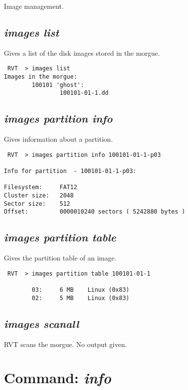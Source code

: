 \documentclass[a4paper,11pt,oneside]{report}
\begin{document}
Image management.



\subsection*{\emph{images list}}

Gives a list of the disk images stored in the morgue.

\begin{verbatim}
 RVT  > images list
Images in the morgue: 
        100101 'ghost':
                100101-01-1.dd

\end{verbatim}



\subsection*{\emph{images partition info}}

Gives information about a partition.

\begin{verbatim}
 RVT  > images partition info 100101-01-1-p03                                 

Info for partition  - 100101-01-1-p03:

Filesystem:     FAT12
Cluster size:   2048
Sector size:    512
Offset:         0000010240 sectors ( 5242880 bytes )
\end{verbatim}

\subsection*{\emph{images partition table}}

Gives the partition table of an image.

\begin{verbatim}
 RVT  > images partition table 100101-01-1

        03:     6 MB    Linux (0x83)
        02:     5 MB    Linux (0x83)
\end{verbatim}


\subsection*{\emph{images scanall}}

RVT scans the morgue. No output given. 

\section{Command: \emph{info}}
\end{document}
